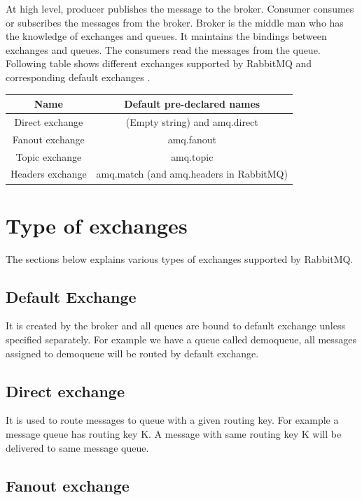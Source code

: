 \documentclass[9pt,twocolumn,twoside]{styles/osajnl}
\begin{document}
\cite{videla2012rabbitmq}At high level, producer publishes the message to the broker. Consumer consumes or subscribes the messages from the broker. Broker is the middle man who has the knowledge of exchanges and queues. It maintains the bindings between exchanges and queues. The consumers read the messages from the queue. Following table shows different exchanges supported by RabbitMQ and corresponding default exchanges\cite{www-rabbitmq-pivotal} .

\begin{center}
 \begin{tabular}{||c c||} 
 \hline
 Name & Default pre-declared names \\ [0.5ex] 
 \hline\hline
 Direct exchange & (Empty string) and amq.direct  \\ 
 \hline
 Fanout exchange & amq.fanout  \\
 \hline
 Topic exchange & amq.topic  \\
 \hline
 Headers exchange & amq.match (and amq.headers in RabbitMQ) \\
 \hline
\end{tabular}
\end{center}

\section{Type of exchanges}
\label{sec:examples}

The sections below explains various types of exchanges supported by RabbitMQ.

\subsection{Default Exchange}

It is created by the broker and all queues are bound to default exchange unless specified separately. For example we have a queue called demoqueue, all messages assigned to demoqueue will be routed by default exchange.

\subsection{Direct exchange}

It is used to route messages to queue with a given routing key. For example a message queue has routing key K. A message with same routing key K will be delivered to same message queue.

\subsection{Fanout exchange}
\end{document}
